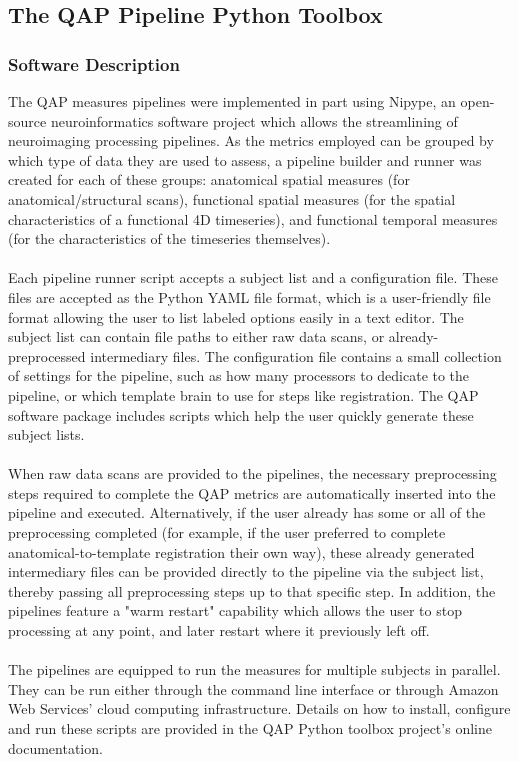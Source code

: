 \documentclass{frontiersSCNS} %
\begin{document}
\subsection{The QAP Pipeline Python Toolbox}
\label{sec:19}
\subsubsection{Software Description}
\label{sec:20}
The QAP measures pipelines were implemented in part using Nipype, an open-source neuroinformatics software project which allows the streamlining of neuroimaging processing pipelines. As the metrics employed can be grouped by which type of data they are used to assess, a pipeline builder and runner was created for each of these groups: anatomical spatial measures (for anatomical/structural scans), functional spatial measures (for the spatial characteristics of a functional 4D timeseries), and functional temporal measures (for the characteristics of the timeseries themselves).
\\\\
Each pipeline runner script accepts a subject list and a configuration file. These files are accepted as the Python YAML file format, which is a user-friendly file format allowing the user to list labeled options easily in a text editor. The subject list can contain file paths to either raw data scans, or already-preprocessed intermediary files. The configuration file contains a small collection of settings for the pipeline, such as how many processors to dedicate to the pipeline, or which template brain to use for steps like registration. The QAP software package includes scripts which help the user quickly generate these subject lists.
\\\\
When raw data scans are provided to the pipelines, the necessary preprocessing steps required to complete the QAP metrics are automatically inserted into the pipeline and executed. Alternatively, if the user already has some or all of the preprocessing completed (for example, if the user preferred to complete anatomical-to-template registration their own way), these already generated intermediary files can be provided directly to the pipeline via the subject list, thereby passing all preprocessing steps up to that specific step. In addition, the pipelines feature a "warm restart" capability which allows the user to stop processing at any point, and later restart where it previously left off.
\\\\
The pipelines are equipped to run the measures for multiple subjects in parallel. They can be run either through the command line interface or through Amazon Web Services' cloud computing infrastructure. Details on how to install, configure and run these scripts are provided in the QAP Python toolbox project’s online documentation.
\end{document}
